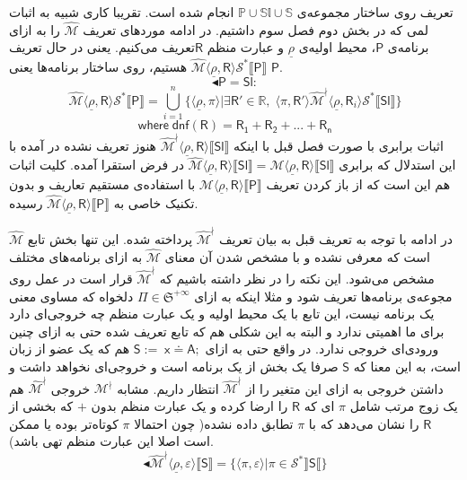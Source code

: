 تعریف روی ساختار مجموعه‌ی 
$\mathbb{P \cup Sl \cup S}$
انجام شده است. تقریبا کاری شبیه به اثبات لمی که در بخش دوم فصل سوم داشتیم.
در ادامه موردهای تعریف $\mathcal{\hat{M}}$ را به ازای برنامه‌ی $\mathsf{P}$، محیط اولیه‌ی $\underline{\rho}$ و عبارت منظم $\mathsf{R}$تعریف می‌کنیم. یعنی در حال تعریف 
$\mathcal{\hat{M}} \langle \underline{\rho} , \mathsf{R} \rangle \mathcal{S}^* 
\llbracket \mathsf{P} \rrbracket$
هستیم، روی ساختار برنامه‌ها یعنی $\mathsf{P}$.
$$\blacktriangleleft \mathsf{P=Sl:}$$
$$\mathcal{\hat{M}} \langle \underline{\rho} , \mathsf{R} \rangle \mathcal{S}^* \llbracket \mathsf{P} \rrbracket=
\bigcup_{i=1}^n \{\langle \underline{\rho} , \pi \rangle | \exists \mathsf{R'} \in \mathbb{R}, \; \langle \pi , \mathsf{R'} \rangle \mathcal{\hat{M}^\nmid}
\langle \underline{\rho}, \mathsf{R}_i \rangle \mathcal{S}^* \llbracket \mathsf{Sl} \rrbracket \}
$$  
$$\mathsf{where\; dnf(R)=R_1 + R_2 + ... + R_n}$$
اثبات برابری با صورت فصل قبل با اینکه 
$\mathcal{\hat{M}^\nmid} \langle \underline{\rho}, \mathsf{R} \rangle \llbracket \mathsf{Sl} \rrbracket$
هنوز تعریف نشده در \cite{calcul} آمده با این استدلال که برابری 
$\mathcal{\hat{M}} \langle \underline{\rho}, \mathsf{R} \rangle \llbracket \mathsf{Sl} \rrbracket=
\mathcal{{M}} \langle \underline{\rho}, \mathsf{R} \rangle \llbracket \mathsf{Sl} \rrbracket$
در فرض استقرا آمده. کلیت اثبات هم این است که از باز کردن تعریف
$\mathcal{{M}} \langle \underline{\rho}, \mathsf{R} \rangle \llbracket \mathsf{P} \rrbracket$
با استفاده‌ی مستقیم تعاریف و بدون تکنیک خاصی به 
$\mathcal{\hat{M}} \langle \underline{\rho}, \mathsf{R} \rangle \llbracket \mathsf{P} \rrbracket$
رسیده.

در ادامه با توجه به تعریف قبل به بیان تعریف 
$\mathcal{\hat{M}^\nmid}$
پرداخته شده. این تنها بخش تابع $\mathcal{\hat{M}}$ است که معرفی نشده و با مشخص شدن آن معنای 
$\mathcal{\hat{M}}$
به ازای برنامه‌های مختلف مشخص می‌شود. این نکته را در نظر داشته باشیم که 
$\mathcal{\hat{M}^\nmid}$
قرار است در عمل روی مجوعه‌ی برنامه‌ها تعریف شود و مثلا اینکه به ازای  
$\Pi \in \mathfrak{S}^{+\infty}$
دلخواه که مساوی معنی یک برنامه نیست، این تابع با یک محیط اولیه و یک عبارت منظم چه خروجی‌ای دارد برای ما اهمیتی ندارد و البته به این شکلی  هم که تابع تعریف شده حتی به ازای چنین ورودی‌ای خروجی ندارد. در واقع حتی به ازای 
$\mathsf{S:=\; x\doteq A;}$
هم که یک عضو از زبان است، به این معنا که $\mathsf{S}$ صرفا یک بخش از یک برنامه است و
 خروجی‌ای نخواهد داشت و داشتن خروجی به ازای این متغیر را از 
$\mathcal{\hat{M}^\nmid}$
انتظار داریم. مشابه 
$\mathcal{M^\nmid}$
خروجی 
$\mathcal{\hat{M}^\nmid}$
هم یک زوج مرتب شامل $\pi$ ای که $\mathsf{R}$ را ارضا کرده و یک عبارت منظم بدون $+$ که بخشی از $\mathsf{R}$ را نشان می‌دهد که با $\pi$ تطابق داده نشده( چون احتمالا $\pi$ کوتاه‌تر بوده یا ممکن است اصلا این عبارت منظم تهی باشد).
$$\blacktriangleleft\mathcal{\hat{M}^\nmid} \langle \underline{\rho}, \mathsf{\varepsilon} \rangle \llbracket \mathsf{S} \rrbracket
=
\{\langle \pi , \varepsilon \rangle | \pi \in \mathcal{S}^* \rrbracket \mathsf{S} \llbracket \}$$

